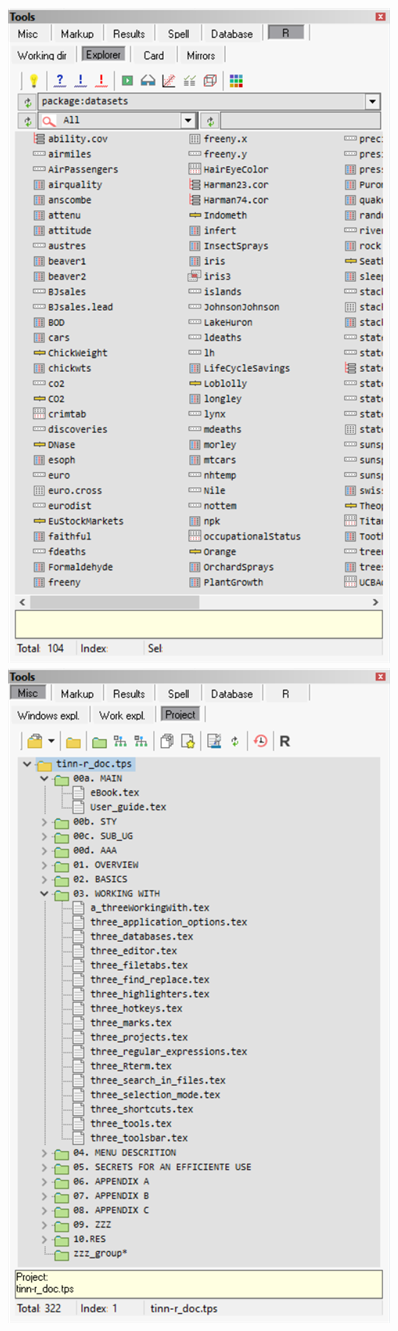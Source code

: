 \includegraphics[scale=0.50]{./res/tools_r_explorer.png}
\includegraphics[scale=0.50]{./res/tools_misc_project.png}


